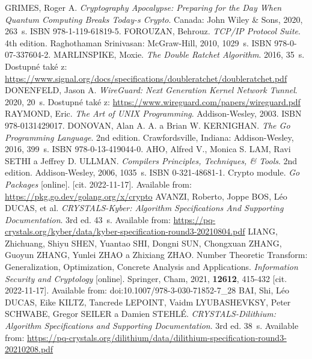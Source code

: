 \begin{thebibliography}{99}
  GRIMES, Roger A. \textit{Cryptography Apocalypse: Preparing for the Day When Quantum Computing Breaks Today-s Crypto}. Canada: John Wiley \& Sons, 2020, 263~s. ISBN 978-1-119-61819-5.
  FOROUZAN, Behrouz. \textit{TCP/IP Protocol Suite}. 4th edition. Raghothaman Srinivasan: McGraw-Hill, 2010, 1029~s. ISBN 978-0-07-337604-2.
  MARLINSPIKE, Moxie. \textit{The Double Ratchet Algorithm}. 2016, 35~s. Dostupné také z: \url{https://www.signal.org/docs/specifications/doubleratchet/doubleratchet.pdf}
  DONENFELD, Jason A. \textit{WireGuard: Next Generation Kernel Network Tunnel}. 2020, 20~s. Dostupné také z: \url{https://www.wireguard.com/papers/wireguard.pdf}
  RAYMOND, Eric. \textit{The Art of UNIX Programming}. Addison-Wesley, 2003. ISBN 978-0131429017.
  DONOVAN, Alan A. A. a Brian W. KERNIGHAN. \textit{The Go Programming Language}. 2nd edition. Crawfordsville, Indiana: Addison-Wesley, 2016, 399~s. ISBN 978-0-13-419044-0.
  AHO, Alfred V., Monica S. LAM, Ravi SETHI a Jeffrey D. ULLMAN. \textit{Compilers Principles, Techniques, \& Tools}. 2nd edition. Addison-Wesley, 2006, 1035~s. ISBN 0-321-48681-1.
  Crypto module. \textit{Go Packages} [online]. [cit. 2022-11-17]. Available from: \url{https://pkg.go.dev/golang.org/x/crypto}
  AVANZI, Roberto, Joppe BOS, Léo DUCAS, et al. \textit{CRYSTALS-Kyber: Algorithm Specifications And Supporting Documentation}. 3rd ed. 43~s. Available from: \url{https://pq-crystals.org/kyber/data/kyber-specification-round3-20210804.pdf}
  LIANG, Zhichuang, Shiyu SHEN, Yuantao SHI, Dongni SUN, Chongxuan ZHANG, Guoyun ZHANG, Yunlei ZHAO a Zhixiang ZHAO. Number Theoretic Transform: Generalization, Optimization, Concrete Analysis and Applications. \textit{Information Security and Cryptology} [online]. Springer, Cham, 2021, \textbf{12612}, 415-432 [cit. 2022-11-17]. Available from: doi:10.1007/978-3-030-71852-7\_28
  BAI, Shi, Léo DUCAS, Eike KILTZ, Tancrede LEPOINT, Vaidm LYUBASHEVKSY, Peter SCHWABE, Gregor SEILER a Damien STEHLÉ. \textit{CRYSTALS-Dilithium: Algorithm Specifications and Supporting Documentation}. 3rd ed. 38~s. Available from: \url{https://pq-crystals.org/dilithium/data/dilithium-specification-round3-20210208.pdf}


\end{thebibliography}

% 
% 
%
